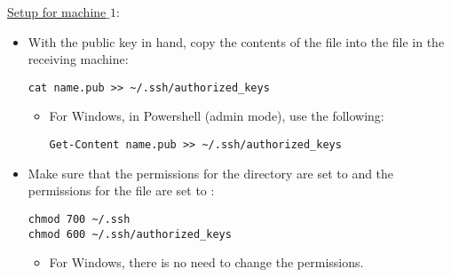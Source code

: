 \underline{\underline{Setup for machine$\_1$}}:

\begin{itemize}
    \item With the public key in hand, copy the contents of the file into the
     file in the receiving machine:
    \begin{verbatim}
cat name.pub >> ~/.ssh/authorized_keys
    \end{verbatim}
    \begin{itemize}
        \item For Windows, in Powershell (admin mode), use the following:
        \begin{verbatim}
Get-Content name.pub >> ~/.ssh/authorized_keys
        \end{verbatim}
    \end{itemize}
    \item Make sure that the permissions for the  directory are set to
     and the permissions for the  file are
    set to :
    \begin{verbatim}
chmod 700 ~/.ssh
chmod 600 ~/.ssh/authorized_keys
    \end{verbatim}
    \begin{itemize}
        \item For Windows, there is no need to change the permissions.
    \end{itemize}
\end{itemize}
